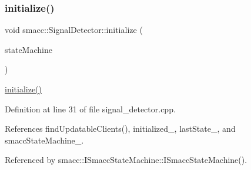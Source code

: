 \subsubsection{\texorpdfstring{initialize()}{initialize()}}
{\footnotesize\ttfamily void smacc\+::\+Signal\+Detector\+::initialize (\begin{DoxyParamCaption}\item[{\hyperlink{classsmacc_1_1ISmaccStateMachine}{I\+Smacc\+State\+Machine} $\ast$}]{state\+Machine }\end{DoxyParamCaption})}

\hyperlink{classsmacc_1_1SignalDetector_a91ab3cd92d8095cdaf8610b50731f04b}{initialize()} 

Definition at line 31 of file signal\+\_\+detector.\+cpp.



References find\+Updatable\+Clients(), initialized\+\_\+, last\+State\+\_\+, and smacc\+State\+Machine\+\_\+.



Referenced by smacc\+::\+I\+Smacc\+State\+Machine\+::\+I\+Smacc\+State\+Machine().



